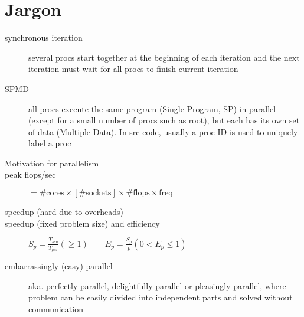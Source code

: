 \section*{Jargon}
\begin{description}

\item[synchronous iteration] several procs start together at the beginning of each iteration and the next iteration must wait for all procs to finish current iteration

\item[SPMD] all procs execute the same program (Single Program, SP) in parallel (except for a small number of procs such as root), but each has its own set of data (Multiple Data). In src code, usually a proc ID is used to uniquely label a proc

\item[Motivation for parallelism]

\item[peak flops/sec] $ = \# \text{cores} \times [\# \text{sockets}] \times \# \text{flops} \times \text{freq}$

\item[speedup (hard due to overheads)]

\item[speedup (fixed problem size) and efficiency] $S_p = \frac{T_{seq}}{T_{par}} (\geq 1)\qquad E_p = \frac{S_{p}}{p} (0 < E_p \leq 1)$


\item[embarrassingly (easy) parallel] aka. perfectly parallel, delightfully parallel or pleasingly parallel, where problem can be easily divided into independent parts and solved without communication


\end{description}
